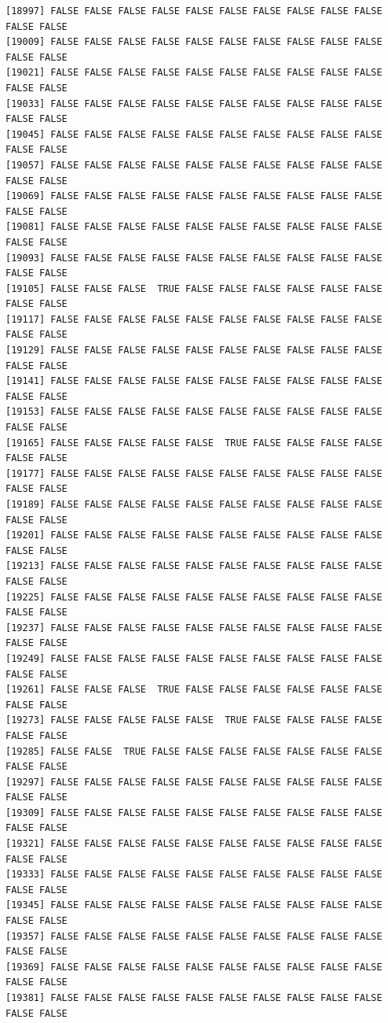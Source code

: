 \documentclass[
  a4paper,
  DIV=11,
  numbers=noendperiod]{scrartcl}
\begin{document}
\begin{verbatim}
[18997] FALSE FALSE FALSE FALSE FALSE FALSE FALSE FALSE FALSE FALSE FALSE FALSE
[19009] FALSE FALSE FALSE FALSE FALSE FALSE FALSE FALSE FALSE FALSE FALSE FALSE
[19021] FALSE FALSE FALSE FALSE FALSE FALSE FALSE FALSE FALSE FALSE FALSE FALSE
[19033] FALSE FALSE FALSE FALSE FALSE FALSE FALSE FALSE FALSE FALSE FALSE FALSE
[19045] FALSE FALSE FALSE FALSE FALSE FALSE FALSE FALSE FALSE FALSE FALSE FALSE
[19057] FALSE FALSE FALSE FALSE FALSE FALSE FALSE FALSE FALSE FALSE FALSE FALSE
[19069] FALSE FALSE FALSE FALSE FALSE FALSE FALSE FALSE FALSE FALSE FALSE FALSE
[19081] FALSE FALSE FALSE FALSE FALSE FALSE FALSE FALSE FALSE FALSE FALSE FALSE
[19093] FALSE FALSE FALSE FALSE FALSE FALSE FALSE FALSE FALSE FALSE FALSE FALSE
[19105] FALSE FALSE FALSE  TRUE FALSE FALSE FALSE FALSE FALSE FALSE FALSE FALSE
[19117] FALSE FALSE FALSE FALSE FALSE FALSE FALSE FALSE FALSE FALSE FALSE FALSE
[19129] FALSE FALSE FALSE FALSE FALSE FALSE FALSE FALSE FALSE FALSE FALSE FALSE
[19141] FALSE FALSE FALSE FALSE FALSE FALSE FALSE FALSE FALSE FALSE FALSE FALSE
[19153] FALSE FALSE FALSE FALSE FALSE FALSE FALSE FALSE FALSE FALSE FALSE FALSE
[19165] FALSE FALSE FALSE FALSE FALSE  TRUE FALSE FALSE FALSE FALSE FALSE FALSE
[19177] FALSE FALSE FALSE FALSE FALSE FALSE FALSE FALSE FALSE FALSE FALSE FALSE
[19189] FALSE FALSE FALSE FALSE FALSE FALSE FALSE FALSE FALSE FALSE FALSE FALSE
[19201] FALSE FALSE FALSE FALSE FALSE FALSE FALSE FALSE FALSE FALSE FALSE FALSE
[19213] FALSE FALSE FALSE FALSE FALSE FALSE FALSE FALSE FALSE FALSE FALSE FALSE
[19225] FALSE FALSE FALSE FALSE FALSE FALSE FALSE FALSE FALSE FALSE FALSE FALSE
[19237] FALSE FALSE FALSE FALSE FALSE FALSE FALSE FALSE FALSE FALSE FALSE FALSE
[19249] FALSE FALSE FALSE FALSE FALSE FALSE FALSE FALSE FALSE FALSE FALSE FALSE
[19261] FALSE FALSE FALSE  TRUE FALSE FALSE FALSE FALSE FALSE FALSE FALSE FALSE
[19273] FALSE FALSE FALSE FALSE FALSE  TRUE FALSE FALSE FALSE FALSE FALSE FALSE
[19285] FALSE FALSE  TRUE FALSE FALSE FALSE FALSE FALSE FALSE FALSE FALSE FALSE
[19297] FALSE FALSE FALSE FALSE FALSE FALSE FALSE FALSE FALSE FALSE FALSE FALSE
[19309] FALSE FALSE FALSE FALSE FALSE FALSE FALSE FALSE FALSE FALSE FALSE FALSE
[19321] FALSE FALSE FALSE FALSE FALSE FALSE FALSE FALSE FALSE FALSE FALSE FALSE
[19333] FALSE FALSE FALSE FALSE FALSE FALSE FALSE FALSE FALSE FALSE FALSE FALSE
[19345] FALSE FALSE FALSE FALSE FALSE FALSE FALSE FALSE FALSE FALSE FALSE FALSE
[19357] FALSE FALSE FALSE FALSE FALSE FALSE FALSE FALSE FALSE FALSE FALSE FALSE
[19369] FALSE FALSE FALSE FALSE FALSE FALSE FALSE FALSE FALSE FALSE FALSE FALSE
[19381] FALSE FALSE FALSE FALSE FALSE FALSE FALSE FALSE FALSE FALSE FALSE FALSE

\end{verbatim}
\end{document}
